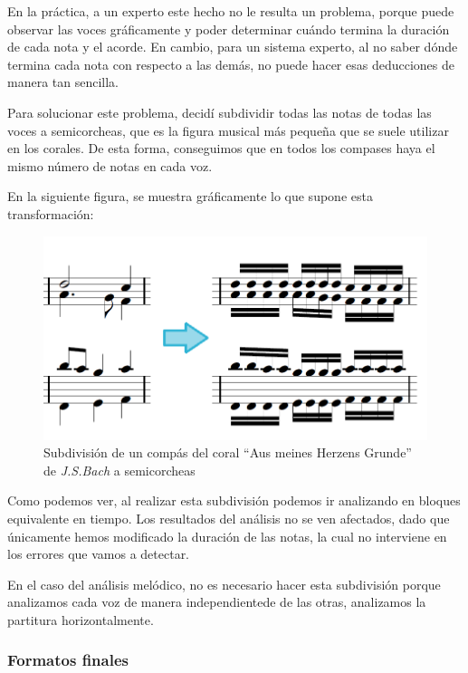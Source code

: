 En la práctica, a un experto este hecho no le resulta un problema, porque puede observar las voces gráficamente y poder determinar cuándo termina la duración de cada nota y el acorde. En cambio, para un sistema experto, al no saber dónde termina cada nota con respecto a las demás, no puede hacer esas deducciones de manera tan sencilla. 

Para solucionar este problema, decidí subdividir todas las notas de todas las voces a semicorcheas, que es la figura musical más pequeña que se suele utilizar en los corales. De esta forma, conseguimos que en todos los compases haya el mismo número de notas en cada voz.

En la siguiente figura, se muestra gráficamente lo que supone esta transformación:


\begin{figure}[H]
	\centering
	\includegraphics[scale=0.5]{imagenes/division.png}
	\caption{Subdivisión de un compás del coral ``Aus meines Herzens Grunde'' de \textit{J.S.Bach} a semicorcheas}
	\label{fig5.1.1}
\end{figure}

Como podemos ver, al realizar esta subdivisión podemos ir analizando en bloques equivalente en tiempo. Los resultados del análisis no se ven afectados, dado que únicamente hemos modificado la duración de las notas, la cual no interviene en los errores que vamos a detectar.

En el caso del análisis melódico, no es necesario hacer esta subdivisión porque analizamos cada voz de manera independientede de las otras, analizamos la partitura horizontalmente.

\subsubsection{Formatos finales}

